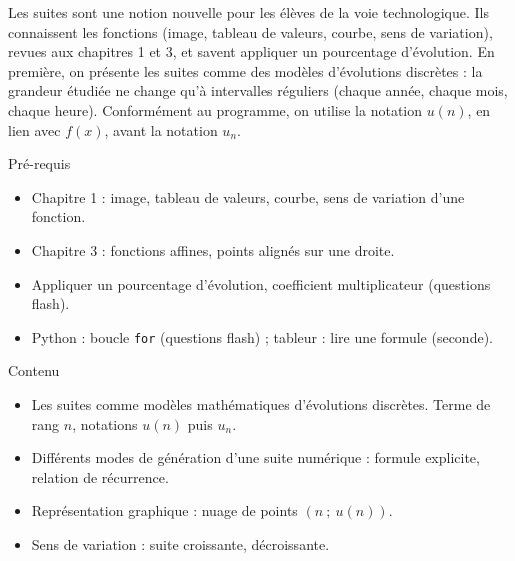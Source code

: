 \documentclass{article}
\theoremstyle{definition}
\begin{document}
\pagestyle{fancy}

\fancyhf{} %
\fancyhead[L]{\large \textbf{\Niveau}}
\fancyhead[C]{\large \textbf{\Chapitre}}

\large

Les suites sont une notion nouvelle pour les élèves de la voie technologique. Ils connaissent les fonctions (image, tableau de valeurs, courbe, sens de variation), revues aux chapitres 1 et 3, et savent appliquer un pourcentage d'évolution. En première, on présente les suites comme des modèles d'évolutions discrètes : la grandeur étudiée ne change qu'à intervalles réguliers (chaque année, chaque mois, chaque heure). Conformément au programme, on utilise la notation $u(n)$, en lien avec $f(x)$, avant la notation $u_n$.

\begin{paragraph}{Pré-requis}
  \begin{itemize}
    \item Chapitre 1 : image, tableau de valeurs, courbe, sens de variation d'une fonction.
    \item Chapitre 3 : fonctions affines, points alignés sur une droite.
    \item Appliquer un pourcentage d'évolution, coefficient multiplicateur (questions flash).
    \item Python : boucle \texttt{for} (questions flash) ; tableur : lire une formule (seconde).
  \end{itemize}
\end{paragraph}

\begin{paragraph}{Contenu}
  \begin{itemize}
    \item Les suites comme modèles mathématiques d'évolutions discrètes. Terme de rang $n$, notations $u(n)$ puis $u_n$.
    \item Différents modes de génération d'une suite numérique : formule explicite, relation de récurrence.
    \item Représentation graphique : nuage de points $(n~;~u(n))$.
    \item Sens de variation : suite croissante, décroissante.
  \end{itemize}
\end{paragraph}
\end{document}

